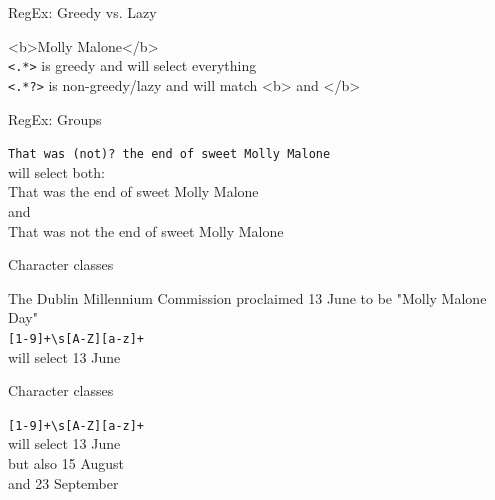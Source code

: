 \documentclass[handout]{beamer}
\begin{document}
\begin{frame}[fragile]{RegEx: Greedy vs. Lazy}
	
	<b>Molly Malone</b> \\
	\lstinline{<.*>} is greedy and will select everything   \\
	\lstinline{<.*?>} is non-greedy/lazy and will match <b> and </b>

	
	
	
\end{frame}


\begin{frame}[fragile]{RegEx: Groups}
	
	\lstinline{That was (not)? the end of sweet Molly Malone} \\ 
	will select both:   \\
	That was the end of sweet Molly Malone \\
	and \\
	That was not the end of sweet Molly Malone
		
	
\end{frame}


\begin{frame}[fragile]{Character classes}
	
	
	The Dublin Millennium Commission proclaimed 13 June to be "Molly Malone Day" \\
	\lstinline{[1-9]+\s[A-Z][a-z]+} \\ 
	will select 13 June

	


\end{frame}


\begin{frame}[fragile]{Character classes}
	

\lstinline{[1-9]+\s[A-Z][a-z]+} \\ 
will select 13 June \\
but also 15 August \\
and 23 September
	
	

	
\end{frame}
\end{document}
